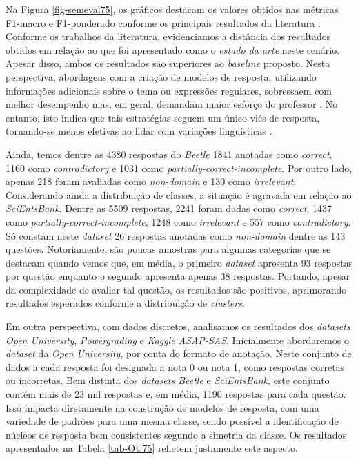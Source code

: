 Na Figura \ref{fig-semeval75}, os gráficos destacam os valores obtidos nas métricas F1-macro e F1-ponderado conforme os principais resultados da literatura \cite{dzikovska2013, ramachandran2015a,sahu2020}. Conforme os trabalhos da literatura, evidenciamos a distância dos resultados obtidos em relação ao que foi apresentado como o \textit{estado da arte} neste cenário. Apesar disso, ambos os resultados são superiores ao \textit{baseline} proposto. Nesta perspectiva, abordagens com a criação de modelos de resposta, utilizando informações adicionais sobre o tema ou expressões regulares, sobressaem com melhor desempenho mas, em geral, demandam maior esforço do professor \cite{ramachandran2015a, sahu2020}. No entanto, isto indica que tais estratégias seguem um único viés de resposta, tornando-se menos efetivas ao lidar com variações linguísticas \cite{filighera2020}.

Ainda, temos dentre as 4380 respostas do \textit{Beetle} 1841 anotadas como \textit{correct}, 1160 como \textit{contradictory} e 1031 como \textit{partially-correct-incomplete}. Por outro lado, apenas 218 foram avaliadas como \textit{non-domain} e 130 como \textit{irrelevant}. Considerando ainda a distribuição de classes, a situação é agravada em relação ao \textit{SciEntsBank}. Dentre as 5509 respostas, 2241 foram dadas como \textit{correct}, 1437 como \textit{partially-correct-incomplete}, 1248 como \textit{irrelevant} e 557 como \textit{contradictory}. Só constam neste \textit{dataset} 26 respostas anotadas como \textit{non-domain} dentre as 143 questões. Notoriamente, são poucas amostras para algumas categorias que se destacam quando vemos que, em média, o primeiro \textit{dataset} apresenta 93 respostas por questão enquanto o segundo apresenta apenas 38 respostas. Portando, apesar da complexidade de avaliar tal questão, os resultados são positivos, aprimorando resultados esperados conforme a distribuição de \textit{clusters}.

Em outra perspectiva, com dados discretos, analisamos os resultados dos \textit{datasets Open University}, \textit{Powergrading} e \textit{Kaggle ASAP-SAS}. Inicialmente abordaremos o \textit{dataset} da \textit{Open University}, por conta do formato de anotação. Neste conjunto de dados a cada resposta foi designada a nota 0 ou nota 1, como respostas corretas ou incorretas. Bem distinta dos \textit{datasets Beetle} e \textit{SciEntsBank}, este conjunto contém mais de 23 mil respostas e, em média, 1190 respostas para cada questão. Isso impacta diretamente na construção de modelos de resposta, com uma variedade de padrões para uma mesma classe, sendo possível a identificação de núcleos de resposta bem consistentes segundo a simetria da classe. Os resultados apresentados na Tabela \ref{tab-OU75} refletem justamente este aspecto.

